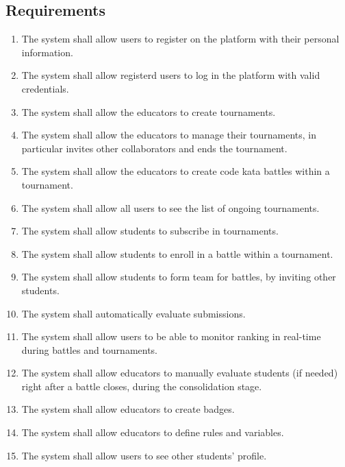     \subsection{Requirements}
        \begin{enumerate}[series=requirements, label=\textbf{R.\arabic*}]
            \item {} {The system shall allow users to register on the platform with their personal information.}
            \item {} {The system shall allow registerd users to log in the platform with valid credentials.}
            \item {} {The system shall allow the educators to create tournaments.}
            \item {} {The system shall allow the educators to manage their tournaments, in particular invites other collaborators and ends the tournament.}
            \item {} {The system shall allow the educators to create code kata battles within a tournament.}
            \item {} {The system shall allow all users to see the list of ongoing tournaments.}
            \item {} {The system shall allow students to subscribe in tournaments.}
            \item {} {The system shall allow students to enroll in a battle within a tournament.}
            \item {} {The system shall allow students to form team for battles, by inviting other students.}
            \item {} {The system shall automatically evaluate submissions.}
            \item {} {The system shall allow users to be able to monitor ranking in real-time during battles and tournaments.}
            \item {} {The system shall allow educators to manually evaluate students (if needed) right after a battle closes, during the consolidation stage.}
            \item {} {The system shall allow educators to create badges.}
            \item {} {The system shall allow educators to define rules and variables.}
            \item {} {The system shall allow users to see other students' profile.}

\end{enumerate}

